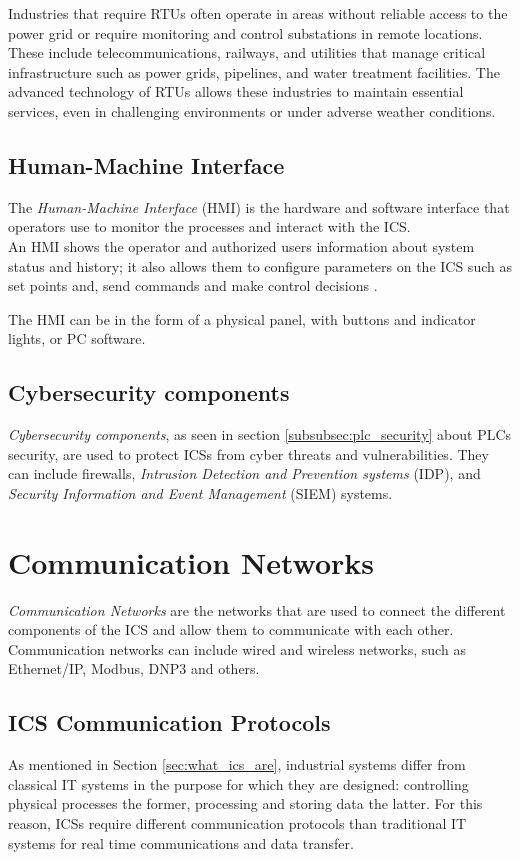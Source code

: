 \bigskip
Industries that require RTUs often operate in areas without reliable access to the power grid or require monitoring and control substations in remote locations. These include telecommunications, railways, and utilities that manage critical infrastructure such as power grids, pipelines, and water treatment facilities. The advanced technology of RTUs allows these industries to maintain essential services, even in challenging environments or under adverse weather conditions.

\subsection{Human-Machine Interface}
\label{subsec:hmi}
The \textit{Human-Machine Interface} (HMI) is the hardware and software interface that operators use to monitor the processes and interact with the ICS. 
\\
An HMI shows the operator and authorized users information about system status and history; it also allows them to configure parameters on the ICS such as set points and, send commands and make control decisions \cite{hmi_definition}.

The HMI can be in the form of a physical panel, with buttons and indicator lights, or PC software.

\subsection{Cybersecurity components}
\textit{Cybersecurity components}, as seen in section \ref{subsubsec:plc_security} about PLCs security, are used to protect  ICSs from cyber threats and vulnerabilities. They can include firewalls, \textit{Intrusion Detection and Prevention systems} (IDP), and \textit{Security Information and Event Management} (SIEM) systems.

\section{Communication Networks}
\textit{Communication Networks} are the networks that are used to connect the different components of the ICS and allow them to communicate with each other. Communication networks can include wired and wireless networks, such as Ethernet/IP, Modbus, DNP3 and others.

\subsection{ICS Communication Protocols}
\label{subsec:ics_protocols}
As mentioned in Section \ref{sec:what_ics_are}, industrial systems differ from classical IT systems in the purpose for which they are designed: controlling physical processes the former, processing and storing data the latter. For this reason, ICSs require different communication protocols than traditional IT systems for real time communications and data transfer.

